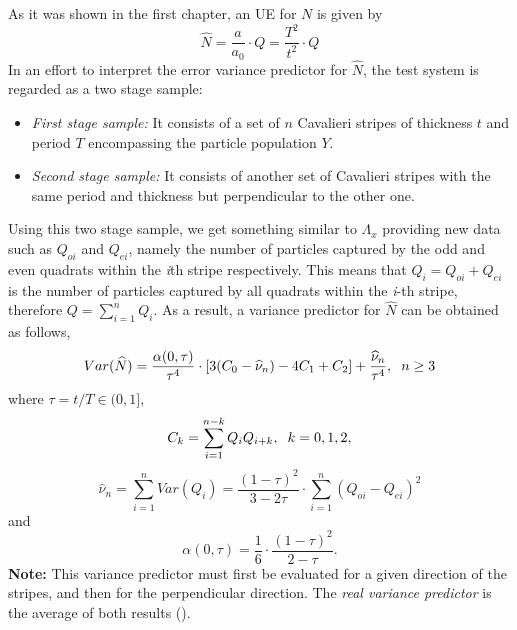 As it was shown in the first chapter, an UE for $N$ is given by
\begin{equation*}
    \widehat{N} = \frac{a}{a_0} \cdot Q = \frac{T^2}{t^2} \cdot Q
\end{equation*}
In an effort to interpret the error variance predictor for $\widehat{N}$, the test system is regarded as a two stage sample:
\begin{itemize}
    \item \textit{First stage sample:} It consists of a set of $n$ Cavalieri stripes of thickness $t$ and period $T$ encompassing the particle population $Y$.
    \item \textit{Second stage sample:} It consists of another set of Cavalieri stripes with the same period and thickness but perpendicular to the other one.
\end{itemize}
Using this two stage sample, we get something similar to $\Lambda_x$ providing new data such as $Q_{oi}$ and $Q_{ei}$, namely the number of particles captured by the odd and even quadrats within the \textit{i}th stripe respectively. This means that $Q_i=Q_{oi}+Q_{ei}$ is the number of particles captured by all quadrats within the \textit{i}-th stripe, therefore $Q=\sum_{i=1}^n Q_i$. As a result, a variance predictor for $\widehat{N}$ can be obtained as follows,%
\begin{equation*}
    Var(\widehat{N}) = \frac{\alpha(0,\tau)}{\tau^4}\cdot [3(C_0-\widehat{\nu}_n) - 4C_1 + C_2] + \frac{\widehat{\nu}_n}{\tau^4}, \hspace{2mm} n\geq 3
\end{equation*}
where $\tau = t/T \in (0,1]$,
\begin{equation*}
    C_k = \sum_{i=1}^{n-k}Q_i Q_{i+k}, \hspace{2mm} k=0,1,2,
\end{equation*}
\begin{equation*}
    \widehat{\nu}_n = \sum_{i=1}^n Var(Q_i) = \frac{(1-\tau)^2}{3-2\tau} \cdot \sum_{i=1}^n (Q_{oi}-Q_{ei})^2
\end{equation*}
and
\begin{equation*}
    \alpha(0,\tau) = \frac{1}{6}\cdot \frac{(1-\tau)^2}{2-\tau}.
\end{equation*}
\textbf{Note:} This variance predictor must first be evaluated for a given direction of the stripes, and then for the perpendicular direction. The \textit{real variance predictor} is the average of both results (\cite{SterThAppl-2022-07-21.pdf}).


